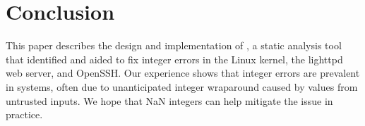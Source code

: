 \section{Conclusion}
\label{s:concl}

This paper describes the design and implementation of \sys, a static
analysis tool that identified and aided to fix \nrbugs integer
errors in the Linux kernel, the lighttpd web server, and OpenSSH.
Our experience shows that integer errors are prevalent in systems,
often due to unanticipated integer wraparound caused by values from
untrusted inputs.  We hope that NaN integers can help mitigate the
issue in practice.
